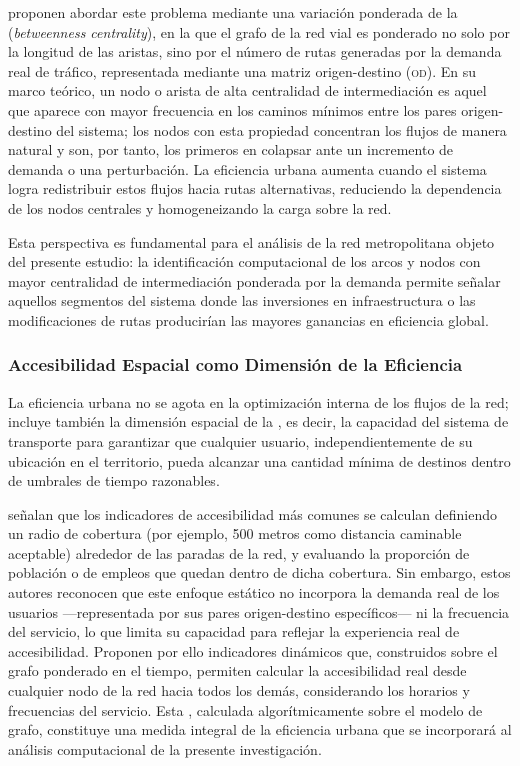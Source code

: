 \citet{batista2015} proponen abordar este problema mediante una variación
ponderada de la  (\textit{betweenness
centrality}), en la que el grafo de la red vial es ponderado no solo por la
longitud de
las aristas, sino por el número de rutas generadas por la demanda real de
tráfico,
representada mediante una matriz origen-destino (\textsc{od}). En su marco
teórico,
un nodo o arista de alta centralidad de intermediación es aquel que aparece con
mayor
frecuencia en los caminos mínimos entre los pares origen-destino del sistema;
los
nodos con esta propiedad concentran los flujos de manera natural y son, por
tanto,
los primeros en colapsar ante un incremento de demanda o una perturbación. La
eficiencia urbana aumenta cuando el sistema logra redistribuir estos flujos
hacia rutas
alternativas, reduciendo la dependencia de los nodos centrales y homogeneizando
la carga sobre la red.
 
Esta perspectiva es fundamental para el análisis de la red metropolitana objeto
del
presente estudio: la identificación computacional de los arcos y nodos con mayor
centralidad de intermediación ponderada por la demanda permite señalar aquellos
segmentos del sistema donde las inversiones en infraestructura o las
modificaciones
de rutas producirían las mayores ganancias en eficiencia global.
 \subsubsection{Accesibilidad Espacial como Dimensión de la Eficiencia}
\label{subsubsec:accesibilidad-espacial}
 
La eficiencia urbana no se agota en la optimización interna de los flujos de la
red;
incluye también la dimensión espacial de la , es decir,
la
capacidad del sistema de transporte para garantizar que cualquier usuario,
independientemente de su ubicación en el territorio, pueda alcanzar una cantidad
mínima de destinos dentro de umbrales de tiempo razonables.
 
\citet{fortin2016innovative} señalan que los indicadores de accesibilidad más
comunes se
calculan definiendo un radio de cobertura (por ejemplo, 500 metros como
distancia
caminable aceptable) alrededor de las paradas de la red, y evaluando la
proporción
de población o de empleos que quedan dentro de dicha cobertura. Sin embargo,
estos
autores reconocen que este enfoque estático no incorpora la demanda real de los
usuarios ---representada por sus pares origen-destino específicos--- ni la
frecuencia
del servicio, lo que limita su capacidad para reflejar la experiencia real de
accesibilidad. Proponen por ello indicadores dinámicos que, construidos sobre el
grafo ponderado en el tiempo, permiten calcular la accesibilidad real desde
cualquier
nodo de la red hacia todos los demás, considerando los horarios y frecuencias
del
servicio. Esta , calculada algorítmicamente
sobre el
modelo de grafo, constituye una medida integral de la eficiencia urbana que se
incorporará al análisis computacional de la presente investigación.

